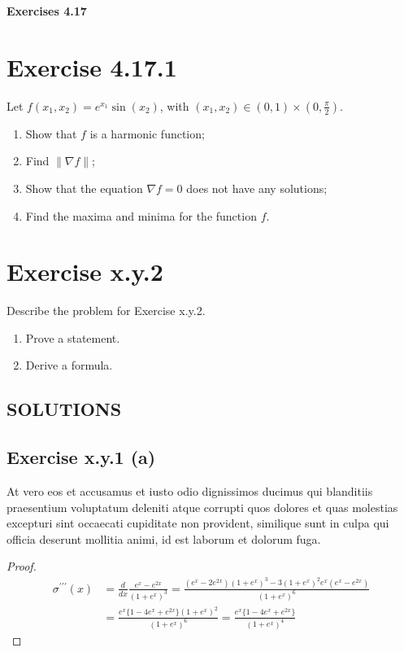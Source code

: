 \documentclass{exam}
\begin{document}
\begin{center}
    \textbf{\Large Exercises 4.17 }
\end{center}

\section*{Exercise 4.17.1}
Let $f(x_1,x_2) = e^{x_1}\sin(x_2)$, with $(x_1,x_2) \in (0,1) \times (0,\frac{\pi}{2})$.
\begin{enumerate}
    \item Show that $f$ is a harmonic function;
    \item Find $\lVert \nabla f \lVert$;
    \item Show that the equation $\nabla f = 0$ does not have any solutions;
    \item Find the maxima and minima for the function $f$.
\end{enumerate}

\section*{Exercise x.y.2}
 Describe the problem for Exercise x.y.2.
\begin{enumerate}
    \item Prove a statement.
    \item Derive a formula.
\end{enumerate}


\newpage

\begin{center}    
    \section*{SOLUTIONS}
\end{center}

\subsection*{Exercise x.y.1 (a)}
At vero eos et accusamus et iusto odio dignissimos ducimus qui blanditiis praesentium voluptatum deleniti atque corrupti quos 
dolores et quas molestias excepturi sint occaecati cupiditate non provident, similique sunt in culpa qui officia deserunt mollitia animi, 
id est laborum et dolorum fuga.
\begin{proof}
    \begin{equation*}     
        \begin{aligned}
            \sigma^{\prime\prime\prime}(x) &= \frac{d}{ d x} \frac{e^{x}-e^{2x}}{(1 + e^{x})^3} = \frac{(e^x - 2e^{2x})(1 + e^x)^3 - 3(1 + e^x)^2 e^{x}(e^x - e^{2x})}{(1 + e^x)^6}\\
            &= \frac{e^{x} \{ 1 - 4e^x + e^{2x} \}(1 + e^x)^2}{(1 + e^x)^{6}} = \frac{e^{x} \{ 1 - 4e^x + e^{2x} \}}{(1 + e^x)^{4}}
        \end{aligned}
\end{equation*}
\end{proof}
\end{document}
